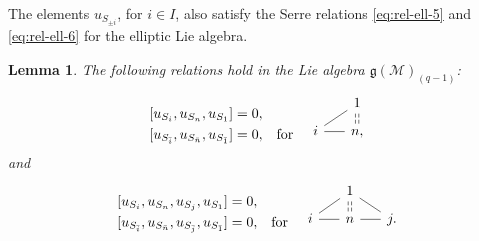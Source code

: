 \documentclass[12pt,reqno]{amsart}
\numberwithin{equation}{section}
\newtheorem{lemma}[theorem]{Lemma}
\begin{document}
	
	The elements $u_{S_{\pm i}}$, for $i\in I$, also satisfy the Serre relations \eqref{eq:rel-ell-5} and \eqref{eq:rel-ell-6} for the elliptic Lie algebra.
	
	\begin{lemma}\label{lem:ell-relation}
		The following relations hold in the Lie algebra $\mathfrak{g}(\mathcal{M})_{(q-1)}$:
		\begin{equation*}
			\begin{aligned}[b]
				&[u_{S_i},u_{S_n},u_{S_1}]=0,\\
				&[u_{S_{\bar i}},u_{S_{\bar n}},u_{S_{\bar 1}}] = 0,
			\end{aligned}
			\quad \text{for} \quad
			\begin{tikzcd}[
				baseline={([yshift=0.3em]current bounding box.south)}, 
				row sep={2em, between origins}, 
				column sep=1.5em, 
				ampersand replacement=\&
				]
				\& 1 \\
				i \arrow[ur, no head] \arrow[r, no head] \& n, \arrow[u, dashed, shift left=0.5, no head] \arrow[u, dashed, shift right=0.5, no head]
			\end{tikzcd}
		\end{equation*}
		and
		\begin{equation*}
			\begin{aligned}[b]
				&[u_{S_i},u_{S_n},u_{S_j},u_{S_1}]=0,\\
				&[u_{S_{\bar i}},u_{S_{\bar n}},u_{S_{\bar j}},u_{S_{\bar 1}}]=0,
			\end{aligned}
			\quad \text{for} \quad
			\begin{tikzcd}[
				baseline={([yshift=0.3em]current bounding box.south)}, 
				row sep={2em, between origins}, 
				column sep=1.5em, 
				ampersand replacement=\&
				]
				\& 1 \& \\
				i \arrow[ur, no head] \arrow[r, no head] \& n \arrow[u, dashed, shift left=0.5, no head] \arrow[u, dashed, shift right=0.5, no head] \arrow[r, no head] \& j. \arrow[ul, no head]
			\end{tikzcd}
		\end{equation*}
		

\end{lemma}
\end{document}
